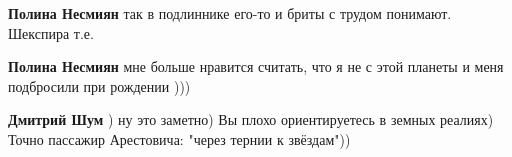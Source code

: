 \begin{itemize}
\begin{itemize}
\textbf{Полина Несмиян} так в подлиннике его-то и бриты с трудом понимают. Шекспира т.е.

 
\textbf{Полина Несмиян} мне больше нравится считать, что я не с этой планеты и меня подбросили при рождении )))

 
\textbf{Дмитрий Шум} ) ну это заметно) Вы плохо ориентируетесь в земных
реалиях) Точно пассажир Арестовича: "через тернии к звёздам"))


\end{itemize}

\end{itemize}

